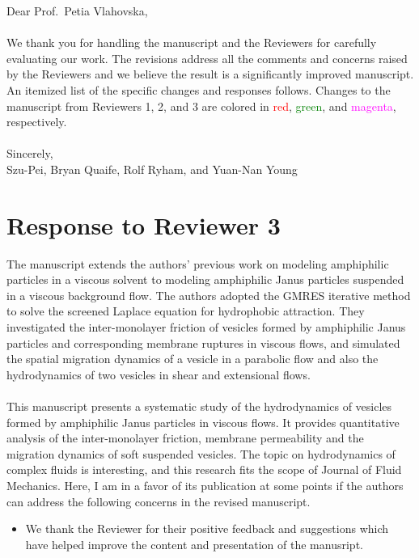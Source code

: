 \documentclass[11pt]{article}
\newcommand{\comment}[1]{{\color{blue} #1}}
\begin{document}
\noindent
Dear Prof.~Petia Vlahovska,
\\ \\
\noindent
We thank you for handling the manuscript and the
Reviewers for carefully evaluating our work. 
The revisions address all the comments and concerns
raised by the Reviewers 
and we believe the result is a significantly improved manuscript.
An itemized list of the specific changes and responses follows.
Changes to the manuscript from Reviewers 1, 2, and 3 are colored in \textcolor{red}{red},
\textcolor{green}{green}, and \textcolor{magenta}{magenta},
respectively. \\ \\
\noindent
Sincerely,
\\
\noindent
Szu-Pei, Bryan Quaife, Rolf Ryham, and Yuan-Nan Young

\section*{Response to Reviewer 3}
\comment{\noindent
The manuscript extends the authors’ previous work on modeling
amphiphilic particles in a viscous solvent to modeling amphiphilic Janus
particles suspended in a viscous background flow. The authors adopted
the GMRES iterative method to solve the screened Laplace equation for
hydrophobic attraction. They investigated the inter-monolayer friction
of vesicles formed by amphiphilic Janus particles and corresponding
membrane ruptures in viscous flows, and simulated the spatial migration
dynamics of a vesicle in a parabolic flow and also the hydrodynamics of
two vesicles in shear and extensional flows.
\\ \\
\noindent
This manuscript presents a systematic study of the hydrodynamics of
vesicles formed by amphiphilic Janus particles in viscous flows. It
provides quantitative analysis of the inter-monolayer friction, membrane
permeability and the migration dynamics of soft suspended vesicles. The
topic on hydrodynamics of complex fluids is interesting, and this
research fits the scope of Journal of Fluid Mechanics. Here, I am in a
favor of its publication at some points if the authors can address the
following concerns in the revised manuscript.
}
\begin{itemize}
\item We thank the Reviewer for their positive feedback
  and suggestions which have helped improve the content and presentation of the
  manusript.
\end{itemize}
\end{document}
